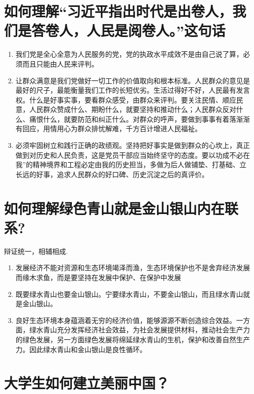 \documentclass[12pt, a4paper, oneside]{ctexbook}
\begin{document}
\section{如何理解“习近平指出时代是出卷人，我们是答卷人，人民是阅卷人。”这句话}

\begin{enumerate}
\item 我们党是全心全意为人民服务的党，党的执政水平成效不是由自己说了算，必须而且只能由人民来评判。

\item 让群众满意是我们党做好一切工作的价值取向和根本标准。人民群众的意见是最好的尺子，最能衡量我们工作的长短优劣。生活过得好不好，人民最有发言权。什么是好事实事，要看群众感受，由群众来评判。要关注民情、顺应民意，人民群众赞成什么、期盼什么，就要坚持和推动什么；人民群众反对什么、痛恨什么，就要防范和纠正什么。对群众的呼声，要做到事事有着落渐渐有回应，用情用心为群众排忧解难，千方百计增进人民福祉。

\item 必须牢固树立和践行正确的政绩观。坚持把好事实是做到群众的心坎上，真正做到对历史和人民负责，这是党员干部应当始终坚守的态度。要以功成不必在我”的精神境界和工程必定由我的历史担当，多做为后人做铺垫、打基础、立长远的好事，追求人民群众的好口碑、历史沉淀之后的真评价。
\end{enumerate}

\section{如何理解绿色青山就是金山银山内在联系?}


辩证统一，相辅相成.
\begin{enumerate}
\item 发展经济不能对资源和生态环境竭泽而渔，生态环境保护也不是舍弃经济发展而缘木求鱼，而是要坚持在发展中保护、在保护中发展

\item 既要绿水青山也要金山银山。宁要绿水青山，不要金山银山，而且绿水青山就是金山银山。

\item 良好生态环境本身蕴涵着无穷的经济价值，能够源源不断创造综合效益。一方面，绿水青山充分发挥经济社会效益，为社会发展提供材料，推动社会生产力的绿色发展，另一方面绿色发展将绵延绿水青山的生机，保护和改善自然生产力。因此绿水青山和金山银山是良性循环。
\end{enumerate}


\section{大学生如何建立美丽中国？}
\end{document}
